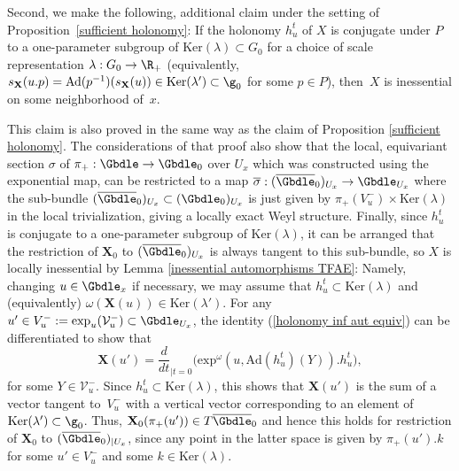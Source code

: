 Second, we make the following, additional claim under the setting of Proposition~\ref{sufficient holonomy}: If the holonomy $h_u^t$ of $X$ is conjugate under $P$ to a one-parameter subgroup of $\mathrm{Ker}(\lambda) \subset G_0$ for a choice of scale representation $\lambda: G_0 \rightarrow \R_+$ (equivalently, $s_{\mathbf{X}}(u.p) = \mathrm{Ad}(p^{-1})(s_{\mathbf{X}}(u)) \in \mathrm{Ker}(\lambda') \subset \g_0$ for some $p \in P$), then~$X$ is inessential on some neighborhood of~$x$.

This claim is also proved in the same way as the claim of Proposition \ref{sufficient holonomy}. The considerations of that proof also show that the local, equivariant section $\sigma$ of $\pi_+: \Gbdle \rightarrow \Gbdle_0$ over $U_x$ which was constructed using the exponential map, can be restricted to a map $\overline{\sigma}: (\overline{\Gbdle}_0)_{U_x} \rightarrow \Gbdle_{U_x}$ where the sub-bundle $(\overline{\Gbdle}_0)_{U_x} \subset (\Gbdle_0)_{U_x}$ is just given by $\pi_+(V_u^-) \times \mathrm{Ker}(\lambda)$ in the local trivialization, giving a locally exact Weyl structure. Finally, since $h_u^t$ is conjugate to a one-parameter subgroup of $\mathrm{Ker}(\lambda)$, it can be arranged that the restriction of $\mathbf{X}_0$ to $(\overline{\Gbdle}_0)_{U_x}$ is always tangent to this sub-bundle, so $X$ is locally inessential by Lemma \ref{inessential automorphisms TFAE}: Namely, changing $u \in \Gbdle_x$ if necessary, we may assume that $h_u^t \subset \mathrm{Ker}(\lambda)$ and (equivalently) $\omega(\mathbf{X}(u)) \in \mathrm{Ker}(\lambda')$. For any $u' \in V_u^- := \mathrm{exp}_u(\mathcal{V}_u^-) \subset \Gbdle_{U_x}$, the identity (\ref{holonomy inf aut equiv}) can be dif\/ferentiated to show that
\[
\mathbf{X}(u') = \frac{d}{dt}_{\vert t=0}\big(\mathrm{exp}^{\omega}(u,\mathrm{Ad}(h_u^t)(Y)).h_u^t\big),
\]
for some $Y \in \mathcal{V}_u^-$. Since $h_u^t \subset \mathrm{Ker}(\lambda)$, this shows that $\mathbf{X}(u')$ is the sum of a vector tangent to~$V_u^-$ with a vertical vector corresponding to an element of $\mathrm{Ker}(\lambda') \subset \g_0$. Thus, $\mathbf{X}_0(\pi_+(u')) \in T\overline{\Gbdle}_0$ and hence this holds for restriction of $\mathbf{X}_0$ to $(\overline{\Gbdle}_0)_{\vert U_x}$, since any point in the latter space is given by $\pi_+(u').k$ for some $u' \in V_u^-$ and some $k \in \mathrm{Ker}(\lambda)$.

